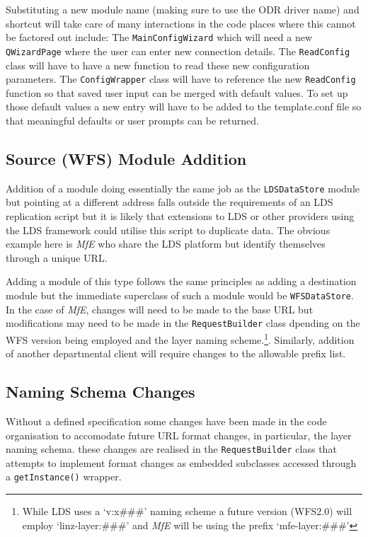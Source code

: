 \documentclass[a4paper]{report}
\begin{document}
Substituting a new module name (making sure to use the ODR driver name) and
shortcut will take care of many interactions in the code places where this
cannot be factored out include: 
The \lstinline|MainConfigWizard| which will need a new \lstinline|QWizardPage|
where the user can enter new connection details.
The \lstinline|ReadConfig| class will have to have a new function to read these
new configuration parameters.
The \lstinline|ConfigWrapper| class will have to reference the new
\lstinline|ReadConfig| function so that saved user input can be merged
with default values.
To set up those default values a new entry will have to be added to the
template.conf file so that meaningful defaults or user prompts can be returned.


\subsection*{Source (WFS) Module Addition}
Addition of a module doing essentially the same job as the
\lstinline|LDSDataStore| module but pointing at a different address falls
outside the requirements of an LDS replication script but it is likely that extensions to LDS or other providers
using the LDS framework could utilise this script to duplicate data. The obvious
example here is \emph{MfE} who share the LDS platform but identify themselves
through a unique URL. 

Adding a module of this type follows the same principles as adding a
destination module but the immediate superclass of such a module would be
\lstinline|WFSDataStore|. In the case of \emph{MfE}, changes will need to be made to the base URL but modifications may
need to be made in the \lstinline|RequestBuilder| class dpending on the
WFS version being employed and the layer naming scheme.\footnote{While
LDS uses a `v:x\#\#\#' naming scheme a future version (WFS2.0) will employ
`linz-layer:\#\#\#' and \emph{MfE} will be using the prefix `mfe-layer:\#\#\#'}.
Similarly, addition of another departmental client will require changes to the
allowable prefix list.

 \subsection*{Naming Schema Changes}
Without a defined specification some changes have been made in the code
organisation to accomodate future URL format changes, in particular, the layer
naming schema. these changes are realised in the \lstinline|RequestBuilder|
class that attempts to implement format changes as embedded subclasses accessed through
a \lstinline|getInstance()| wrapper.
\end{document}
